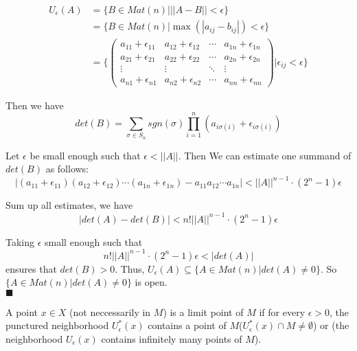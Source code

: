 \documentclass[main.tex]{subfiles}
\begin{document}
\begin{equation}
    \begin{split}
        U_{\epsilon} (A) & = \{B \in Mat(n) | ||A - B|| < \epsilon \}\\
         & = \{B \in Mat(n) | \max(|a_{ij} - b_{ij}|) < \epsilon \}\\ 
         & = \{\begin{pmatrix}
    a_{11}+ \epsilon_{11} & a_{12} + \epsilon_{12} & \cdots & a_{1n} + \epsilon_{1n} \\
    a_{21}+ \epsilon_{21} & a_{22} + \epsilon_{22} & \cdots & a_{2n} + \epsilon_{2n} \\
    \vdots & \vdots & \ddots & \vdots \\
    a_{n1}+ \epsilon_{n1} & a_{n2} + \epsilon_{n2} & \cdots & a_{nn} + \epsilon_{nn}
    \end{pmatrix}| \epsilon_{ij} < \epsilon\}
    \end{split}
\end{equation}

\par Then we have 
\begin{equation}
    det(B) = \sum_{\sigma \in S_n} sgn(\sigma) \prod_{i=1}^{n} (a_{i \sigma(i)} + \epsilon_{i \sigma(i)})
\end{equation}
\par Let $\epsilon$ be small enough such that $\epsilon < ||A||$. Then We can estimate one summand of $det(B)$ as follows:
\begin{equation}
    |(a_{11} + \epsilon_{11})(a_{12} + \epsilon_{12}) \cdots (a_{1n} + \epsilon_{1n}) - a_{11} a_{12} \cdots a_{1n}| < ||A||^{n-1} \cdot (2^n - 1) \epsilon
\end{equation}
\par Sum up all estimates, we have 
\begin{equation}
    |det(A) - det(B)| < n! ||A||^{n-1} \cdot (2^n - 1) \epsilon 
\end{equation}
\par Taking $\epsilon$ small enough such that 
\begin{equation}
    n! ||A||^{n-1} \cdot (2^n - 1) \epsilon < |det(A)|
\end{equation}
ensures that $det(B) > 0$. Thus, $U_{\epsilon} (A) \subseteq \{A \in Mat(n)| det(A) \neq 0\}$. So $\{A \in Mat(n)| det(A) \neq 0\}$ is open. 
\\ \null \hfill $\blacksquare$ 
\begin{definition}
    A point $x\in X$ (not neccessarily in $M$) is a limit point of $M$ if for every $\epsilon > 0$, the punctured neighborhood $U_{\epsilon}^{\ast} (x)$ contains a point of $M$($U_{\epsilon}^*(x) \cap M \neq \emptyset$) or (the neighborhood $U_{\epsilon}(x)$ contains infinitely many points of $M$).
\end{definition}
\end{document}
